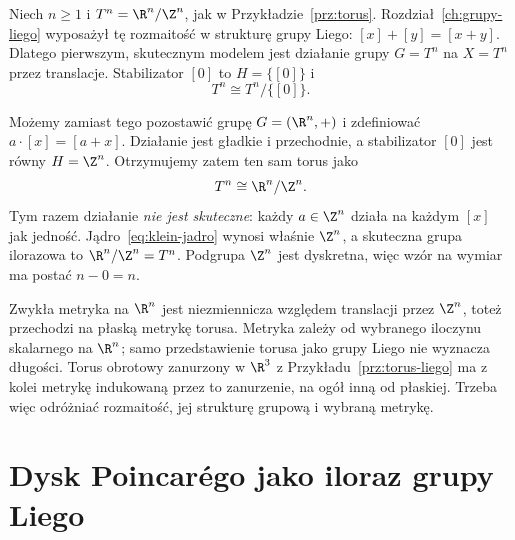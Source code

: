 \begin{przyklad}
\label{prz:klein-torus}
Niech $n\geq1$ i $T^n=\R^n/\Z^n$, jak w
Przykładzie~\ref{prz:torus}. Rozdział~\ref{ch:grupy-liego}
wyposażył tę rozmaitość w strukturę grupy Liego:
$[x]+[y]=[x+y]$. Dlatego pierwszym, skutecznym modelem
jest działanie grupy $G=T^n$ na $X=T^n$ przez translacje.
Stabilizator $[0]$ to $H=\{[0]\}$ i
\[
 T^n\cong T^n/\{[0]\}.
\]

Możemy zamiast tego pozostawić grupę $G=(\R^n,+)$ i
zdefiniować $a\cdot[x]=[a+x]$. Działanie jest gładkie
i przechodnie, a stabilizator $[0]$ jest równy
$H=\Z^n$. Otrzymujemy zatem ten sam torus jako
\[
 T^n\cong\R^n/\Z^n.
\]
Tym razem działanie \emph{nie jest skuteczne}: każdy
$a\in\Z^n$ działa na każdym $[x]$ jak jedność.
Jądro~\eqref{eq:klein-jadro} wynosi właśnie $\Z^n$,
a skuteczna grupa ilorazowa to $\R^n/\Z^n=T^n$.
Podgrupa $\Z^n$ jest dyskretna, więc wzór na wymiar
ma postać $n-0=n$.

Zwykła metryka na $\R^n$ jest niezmiennicza względem
translacji przez $\Z^n$, toteż przechodzi na płaską
metrykę torusa. Metryka zależy od wybranego iloczynu
skalarnego na $\R^n$; samo przedstawienie torusa jako
grupy Liego nie wyznacza długości. Torus obrotowy
zanurzony w $\R^3$ z Przykładu~\ref{prz:torus-liego}
ma z kolei metrykę indukowaną przez to zanurzenie,
na ogół inną od płaskiej. Trzeba więc odróżniać
rozmaitość, jej strukturę grupową i wybraną metrykę.
\end{przyklad}

\section{Dysk Poincarégo jako iloraz grupy Liego}
\label{sec:klein-dysk}

